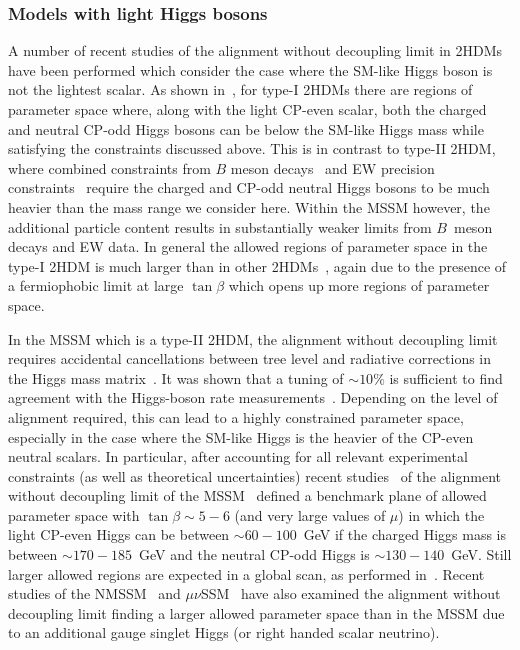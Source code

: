 \documentclass[../report.tex]{subfiles}
\begin{document}
\subsubsection{Models with light Higgs bosons}\label{sec:models}

A number of recent studies of the alignment without decoupling limit in
2HDMs have been performed which consider the case where the SM-like
Higgs boson is not the lightest scalar. As shown
in~\cite{Ilisie:2014hea,Bernon:2015wef,Enberg:2016ygw,Arhrib:2017wmo,Arbey:2017gmh,Bhatia:2017ttp,Fox:2017uwr,Haber:2017erd,Haisch:2017gql},
for type-I 2HDMs there are regions of parameter space where, along with
the light CP-even scalar, both the charged and neutral CP-odd Higgs
bosons can be below the SM-like Higgs mass while satisfying the
constraints discussed above. This is in contrast to type-II 2HDM,
where combined constraints from $B$ meson
decays~\cite{Misiak:2015xwa} and EW precision
constraints~\cite{Peskin:1991sw} require the charged and CP-odd neutral
Higgs bosons to be much heavier than the mass range we consider here. Within the MSSM however, the additional particle content results in
  substantially weaker limits from $B$~meson decays and EW data.
In general the allowed regions of parameter space in the type-I 2HDM is
much larger than in other 2HDMs~\cite{Bernon:2015wef,Haber:2017erd},
again due to the presence of a fermiophobic limit at large $\tan\beta$
which opens up more regions of parameter space. 

In the MSSM which is a type-II 2HDM, the alignment without decoupling
limit~\cite{Carena:2013ooa} requires accidental cancellations between
tree level and radiative corrections in the Higgs mass
matrix~\cite{Bechtle:2016kui,Haber:2017erd}. It was shown that a tuning of $\sim 10\%$ is sufficient to find agreement with the Higgs-boson rate measurements~\cite{Bechtle:2016kui}. Depending on the level of alignment required, this can lead to a highly constrained parameter space, especially in the case where the SM-like Higgs is the heavier of the CP-even neutral scalars. In particular, after accounting for all relevant experimental constraints (as well as theoretical uncertainties) recent studies~\cite{Bahl:2018zmf} of the alignment without decoupling limit of the MSSM~\cite{Carena:2013ooa} defined a benchmark plane of allowed parameter space with $\tan\beta \sim 5 - 6$ (and very large values of $\mu$) in which the light CP-even Higgs can be between  $\sim 60 - 100$~GeV if the charged Higgs mass is between $\sim 170 - 185$~GeV and the neutral CP-odd Higgs is $\sim 130 - 140$~GeV. Still larger allowed regions are expected in a global scan, as performed in~\cite{Bechtle:2016kui}.
Recent studies of the NMSSM~\cite{Carena:2015moc,Domingo:2018uim} and
$\mu\nu$SSM~\cite{Biekotter:2017xmf} have also examined the alignment
without decoupling limit finding a larger allowed parameter space than in the
MSSM due to an additional gauge singlet Higgs (or right handed scalar
neutrino). 
\end{document}
